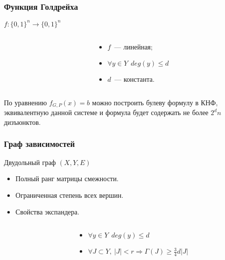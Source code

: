 \begin{frame}
	\frametitle{Функция Голдрейха}
	$f:\{0, 1\}^n \rightarrow \{0, 1\}^n$

    \pause

    \begin{columns}
    	\begin{column}{5.5cm}
            
        \end{column}

        \pause
        \pause
        \begin{column}{5.5cm}
            \begin{itemize}
	            \item $f$~--- линейная;
            	\pause
                \item $\forall y \in Y ~~ deg(y) \le d$
            	\pause
            	\item $d$~--- константа.
            \end{itemize}
        \end{column}
	\end{columns}
    
	\pause
	\begin{remark}
	    По уравнению $f_{G, P}(x) = b$ можно построить булеву формулу
		в КНФ, эквивалентную данной системе и формула будет содержать
        не более $2^dn$ дизъюнктов.
	\end{remark}
\end{frame}

\begin{frame}
    \frametitle{Граф зависимостей}

    Двудольный граф $(X, Y, E)$
    \pause
    \begin{itemize}
	    \item Полный ранг матрицы смежности.
    	\pause
        \item Ограниченная степень всех вершин.
    	\pause
        \item Свойства экспандера.
    \end{itemize}

    \pause

    \begin{columns}
        \begin{column}{5cm}
            
        \end{column}

        \pause
        \pause
        \pause
        \begin{column}{5cm}
            \begin{itemize}
                \item $\forall y \in Y ~~ deg(y) \le d$
            	\pause
	            \item $\forall J \subset Y, ~
            		|J| < r \Rightarrow \Gamma(J) \ge \frac{3}{4}d|J|$
            \end{itemize}
		\end{column}
    \end{columns}

\end{frame}

